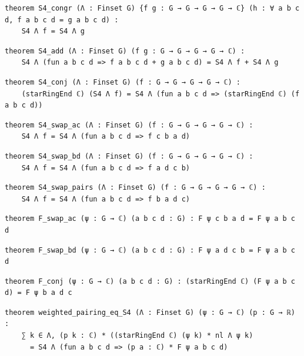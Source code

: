 \begin{lstlisting}[style=leancat]
theorem S4_congr (Λ : Finset G) {f g : G → G → G → G → ℂ} (h : ∀ a b c d, f a b c d = g a b c d) :
    S4 Λ f = S4 Λ g
\end{lstlisting}

\begin{lstlisting}[style=leancat]
theorem S4_add (Λ : Finset G) (f g : G → G → G → G → ℂ) :
    S4 Λ (fun a b c d => f a b c d + g a b c d) = S4 Λ f + S4 Λ g
\end{lstlisting}

\begin{lstlisting}[style=leancat]
theorem S4_conj (Λ : Finset G) (f : G → G → G → G → ℂ) :
    (starRingEnd ℂ) (S4 Λ f) = S4 Λ (fun a b c d => (starRingEnd ℂ) (f a b c d))
\end{lstlisting}

\begin{lstlisting}[style=leancat]
theorem S4_swap_ac (Λ : Finset G) (f : G → G → G → G → ℂ) :
    S4 Λ f = S4 Λ (fun a b c d => f c b a d)
\end{lstlisting}

\begin{lstlisting}[style=leancat]
theorem S4_swap_bd (Λ : Finset G) (f : G → G → G → G → ℂ) :
    S4 Λ f = S4 Λ (fun a b c d => f a d c b)
\end{lstlisting}

\begin{lstlisting}[style=leancat]
theorem S4_swap_pairs (Λ : Finset G) (f : G → G → G → G → ℂ) :
    S4 Λ f = S4 Λ (fun a b c d => f b a d c)
\end{lstlisting}

\begin{lstlisting}[style=leancat]
theorem F_swap_ac (ψ : G → ℂ) (a b c d : G) : F ψ c b a d = F ψ a b c d
\end{lstlisting}

\begin{lstlisting}[style=leancat]
theorem F_swap_bd (ψ : G → ℂ) (a b c d : G) : F ψ a d c b = F ψ a b c d
\end{lstlisting}

\begin{lstlisting}[style=leancat]
theorem F_conj (ψ : G → ℂ) (a b c d : G) : (starRingEnd ℂ) (F ψ a b c d) = F ψ b a d c
\end{lstlisting}

\begin{lstlisting}[style=leancat]
theorem weighted_pairing_eq_S4 (Λ : Finset G) (ψ : G → ℂ) (p : G → ℝ) :
    ∑ k ∈ Λ, (p k : ℂ) * ((starRingEnd ℂ) (ψ k) * nl Λ ψ k)
      = S4 Λ (fun a b c d => (p a : ℂ) * F ψ a b c d)
\end{lstlisting}

